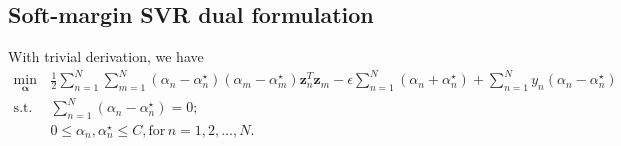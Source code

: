 \documentclass[11pt, a4paper, reqno, twoside]{scrartcl}
\theoremstyle{style}
\newcommand{\0}{\mathbf{0}} %
\newcommand{\balpha}{\bm{\alpha}}
\newcommand{\bz}{\bm{z}}
\begin{document}
\subsection{Soft-margin SVR dual formulation}
With trivial derivation, we have
\begin{equation}
\begin{aligned}
\min_{\balpha} \, &\frac{1}{2} \sum_{n=1}^N \sum_{m=1}^N (\alpha_n - \alpha^\star_n) (\alpha_m - \alpha^\star_m)  \bz_n^T \bz_m - \epsilon \sum_{n=1}^N (\alpha_n+\alpha^\star_n) + \sum_{n=1}^N y_n (\alpha_n -\alpha^\star_n) \\ 
\mathrm{s.t. }   \,                & \sum_{n=1}^N (\alpha_n-\alpha^\star_n) =0; \\
									 & 0 \leq \alpha_n, \alpha^\star_n \leq C,  \mathrm{for }\,  n=1, 2, \ldots, N. 
\end{aligned}
\end{equation}


%


\end{document}

